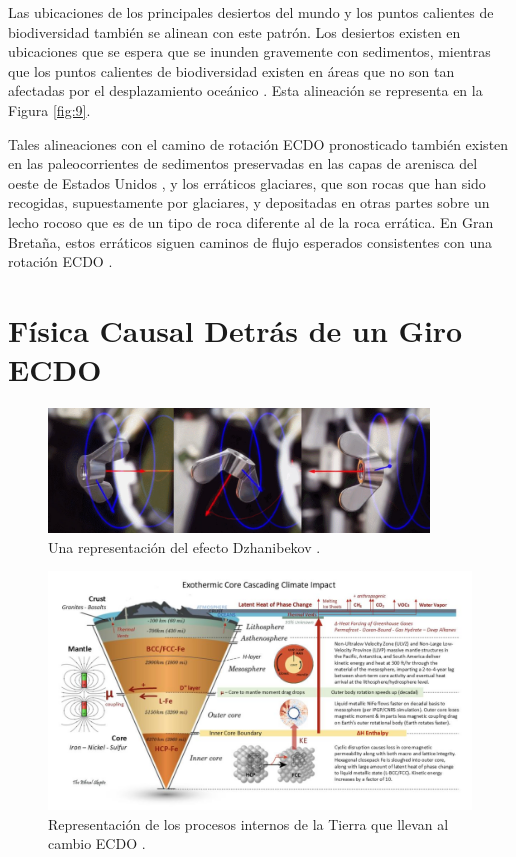 \documentclass[10pt,twocolumn,letterpaper]{article}
\begin{document}
Las ubicaciones de los principales desiertos del mundo y los puntos calientes de biodiversidad también se alinean con este patrón. Los desiertos existen en ubicaciones que se espera que se inunden gravemente con sedimentos, mientras que los puntos calientes de biodiversidad existen en áreas que no son tan afectadas por el desplazamiento oceánico \cite{28}. Esta alineación se representa en la Figura \ref{fig:9}.

Tales alineaciones con el camino de rotación ECDO pronosticado también existen en las paleocorrientes de sedimentos preservadas en las capas de arenisca del oeste de Estados Unidos \cite{21}, y los erráticos glaciares, que son rocas que han sido recogidas, supuestamente por glaciares, y depositadas en otras partes sobre un lecho rocoso que es de un tipo de roca diferente al de la roca errática. En Gran Bretaña, estos erráticos siguen caminos de flujo esperados consistentes con una rotación ECDO \cite{67,68}.

\section{Física Causal Detrás de un Giro ECDO}

\begin{figure}
\begin{center}
\includegraphics[width=0.9\textwidth]{dzhani.jpg}
\end{center}
   \caption{Una representación del efecto Dzhanibekov \cite{28}.}
\label{fig:10}
\end{figure}

\begin{figure}[t]
\begin{center}
\includegraphics[width=1\textwidth]{layers.jpg}
\end{center}
   \caption{Representación de los procesos internos de la Tierra que llevan al cambio ECDO \cite{129}.}
\label{fig:11}
\end{figure}
\end{document}
